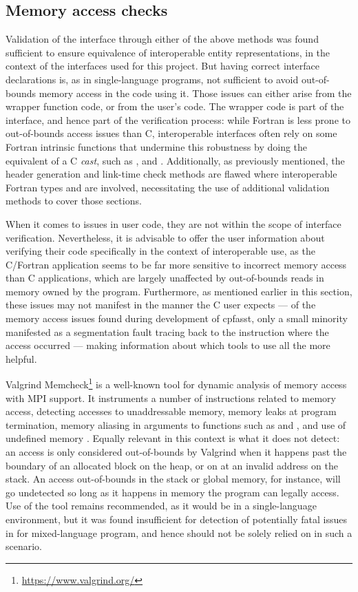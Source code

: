 \subsection*{Memory access checks}

Validation of the interface through either of the above methods was found sufficient to ensure equivalence of interoperable entity representations, in the context of the interfaces used for this project. But having correct interface declarations is, as in single-language programs, not sufficient to avoid out-of-bounds memory access in the code using it. Those issues can either arise from the wrapper function code, or from the user's code. The wrapper code is part of the interface, and hence part of the verification process: while Fortran is less prone to out-of-bounds access issues than C, interoperable interfaces often rely on some Fortran intrinsic functions that undermine this robustness by doing the equivalent of a C \textit{cast}, such as ,  and . Additionally, as previously mentioned, the header generation and link-time check methods are flawed where interoperable Fortran types  and  are involved, necessitating the use of additional validation methods to cover those sections.

When it comes to issues in user code, they are not within the scope of interface verification. Nevertheless, it is advisable to offer the user information about verifying their code specifically in the context of interoperable use, as the C/Fortran application seems to be far more sensitive to incorrect memory access than C applications, which are largely unaffected by out-of-bounds reads in memory owned by the program. Furthermore, as mentioned earlier in this section, these issues may not manifest in the manner the C user expects --- of the memory access issues found during development of cpfasst, only a small minority manifested as a segmentation fault tracing back to the instruction where the access occurred --- making information about which tools to use all the more helpful.

Valgrind Memcheck\footnote{\url{https://www.valgrind.org/}} is a well-known tool for dynamic analysis of memory access with MPI support. It instruments a number of instructions related to memory access, detecting accesses to unaddressable memory, memory leaks at program termination, memory aliasing in arguments to functions such as  and , and use of undefined memory \cite{seward2005using}. Equally relevant in this context is what it does not detect: an access is only considered out-of-bounds by Valgrind when it happens past the boundary of an allocated block on the heap, or on at an invalid address on the stack. An access out-of-bounds in the stack or global memory, for instance, will go undetected so long as it happens in memory the program can legally access. Use of the tool remains recommended, as it would be in a single-language environment, but it was found insufficient for detection of potentially fatal issues in for mixed-language program, and hence should not be solely relied on in such a scenario.

